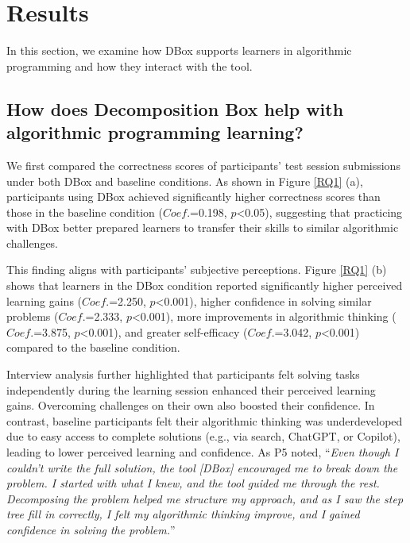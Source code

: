 


\section{Results}
In this section, we examine how DBox supports learners in algorithmic programming and how they interact with the tool. 



\subsection{How does Decomposition Box help with algorithmic programming learning?}

We first compared the correctness scores of participants' test session submissions under both DBox and baseline conditions. As shown in Figure \ref{RQ1} (a), participants using DBox achieved significantly higher correctness scores than those in the baseline condition ($Coef.$=0.198, $p$<0.05), suggesting that practicing with DBox better prepared learners to transfer their skills to similar algorithmic challenges.

This finding aligns with participants' subjective perceptions. Figure \ref{RQ1} (b) shows that learners in the DBox condition reported significantly higher perceived learning gains ($Coef.$=2.250, $p$<0.001), higher confidence in solving similar problems ($Coef.$=2.333, $p$<0.001), more improvements in algorithmic thinking ($Coef.$=3.875, $p$<0.001), and greater self-efficacy ($Coef.$=3.042, $p$<0.001) compared to the baseline condition.



Interview analysis further highlighted that participants felt solving tasks independently during the learning session enhanced their perceived learning gains. Overcoming challenges on their own also boosted their confidence. In contrast, baseline participants felt their algorithmic thinking was underdeveloped due to easy access to complete solutions (e.g., via search, ChatGPT, or Copilot), leading to lower perceived learning and confidence. As P5 noted, ``\emph{Even though I couldn’t write the full solution, the tool [DBox] encouraged me to break down the problem. I started with what I knew, and the tool guided me through the rest. Decomposing the problem helped me structure my approach, and as I saw the step tree fill in correctly, I felt my algorithmic thinking improve, and I gained confidence in solving the problem.}''




